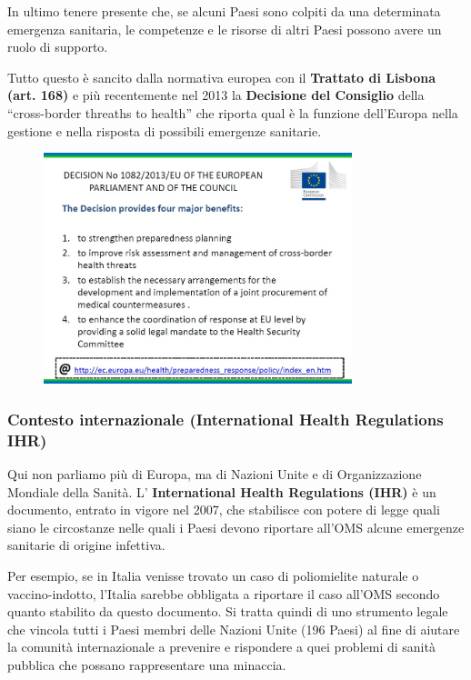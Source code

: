 In ultimo tenere presente che, se alcuni Paesi sono colpiti da una
determinata emergenza sanitaria, le competenze e le risorse di altri
Paesi possono avere un ruolo di supporto.

Tutto questo è sancito dalla normativa europea con il \textbf{Trattato
di Lisbona (art. 168)} e più recentemente nel 2013 la \textbf{Decisione
del Consiglio} della ``cross-border threaths to health'' che riporta
qual è la funzione dell'Europa nella gestione e nella risposta di
possibili emergenze sanitarie.

\begin{figure}[!ht]
\centering
	\includegraphics[width=0.8\textwidth]{26/image5.jpeg}
	\end{figure}

\subsubsection{Contesto internazionale (International Health Regulations IHR)}

Qui non parliamo più di Europa, ma di Nazioni Unite e di Organizzazione
Mondiale della Sanità. L' \textbf{International Health Regulations
(IHR)} è un documento, entrato in vigore nel 2007, che stabilisce con
potere di legge quali siano le circostanze nelle quali i Paesi devono
riportare all'OMS alcune emergenze sanitarie di origine infettiva.

Per esempio, se in Italia venisse trovato un caso di poliomielite
naturale o vaccino-indotto, l'Italia sarebbe obbligata a riportare il
caso all'OMS secondo quanto stabilito da questo documento. Si tratta
quindi di uno strumento legale che vincola tutti i Paesi membri delle
Nazioni Unite (196 Paesi) al fine di aiutare la comunità internazionale
a prevenire e rispondere a quei problemi di sanità pubblica che possano
rappresentare una minaccia.

